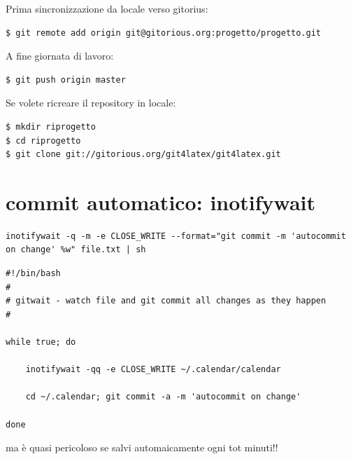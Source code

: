 \documentclass[a4paper,12pt,oneside]{article}
\begin{document}
Prima sincronizzazione da locale verso gitorius:
\begin{lstlisting}
$ git remote add origin git@gitorious.org:progetto/progetto.git
\end{lstlisting}

A fine giornata di lavoro:
\begin{lstlisting}
$ git push origin master
\end{lstlisting}

Se volete ricreare il repository in locale:
\begin{lstlisting}
$ mkdir riprogetto
$ cd riprogetto
$ git clone git://gitorious.org/git4latex/git4latex.git
\end{lstlisting}

\section{commit automatico: inotifywait}

\begin{lstlisting}
inotifywait -q -m -e CLOSE_WRITE --format="git commit -m 'autocommit on change' %w" file.txt | sh
\end{lstlisting}

\begin{lstlisting}
#!/bin/bash
#
# gitwait - watch file and git commit all changes as they happen
#

while true; do

    inotifywait -qq -e CLOSE_WRITE ~/.calendar/calendar

    cd ~/.calendar; git commit -a -m 'autocommit on change'

done
\end{lstlisting}
ma è quasi pericoloso se salvi automaicamente ogni tot minuti!!
\end{document}
